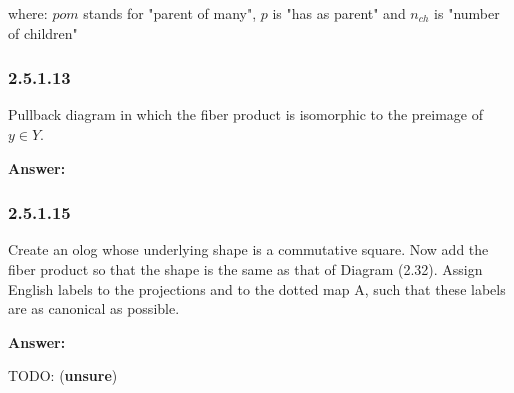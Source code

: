 \documentclass{article}
\newcommand{\vsp}[0]{\vspace*{10pt}\par}
\newcommand{\exercise}[1]{\subsubsection*{#1}}
\newcommand{\ans}[0]{\vsp\textbf{Answer: }\vsp}
\newcommand{\unsure}[0]{TODO: (\textbf{unsure}) }
\begin{document}
\begin{center}
\end{center}

where: $pom$ stands for "parent of many", $p$ is "has as parent" and $n_{ch}$
is "number of children"

\exercise{2.5.1.13}

Pullback diagram in which the fiber product is isomorphic to the preimage of $y \in Y$.

\ans

\begin{center}
\end{center}

\exercise{2.5.1.15}

Create an olog whose underlying shape is a commutative square. Now add the
fiber product so that the shape is the same as that of Diagram (2.32). Assign
English labels to the projections and to the dotted map A, such that these
labels are as canonical as possible.

\ans

\unsure
\end{document}

